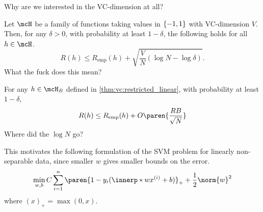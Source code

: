 Why are we interested in the VC-dimension at all?
\begin{fact*} \label{thm:vc:bound}
    Let $\mcH$ be a family of functions taking values in $\{-1, 1\}$
    with VC-dimension $V$.
    Then, for any $\delta > 0$, with probability at least $1-\delta$,
    the following holds for all $h \in \mcH$. \[
        R(h) \le R_{\text{emp}}(h)
            + \sqrt{\frac{V}{N} (\log N - \log \delta)}.
    \]
    \textcolor{exercise}{What the fuck does this mean?}
\end{fact*}

\begin{corollary}
    For any $h \in \mcH_B$ defined in \cref{thm:vc:restricted_linear},
    with probability at least $1-\delta$, \[
        R(h) \le R_{\text{emp}}(h)
            + O\paren{\frac{RB}{\sqrt N}}
    \]
    \textcolor{exercise}{Where did the $\log N$ go?}
\end{corollary}

This motivates the following formulation of the SVM problem for
linearly non-separable data, since smaller $w$ gives smaller bounds on
the error.
\[
    \min_{w, b} C\sum_{i=1}^{n} \paren{1 - y_i (\innerp*{w}{x^{(i)}} + b)}_+
    + \frac12 \norm{w}^2
\] where $(x)_+ = \max(0, x)$.
